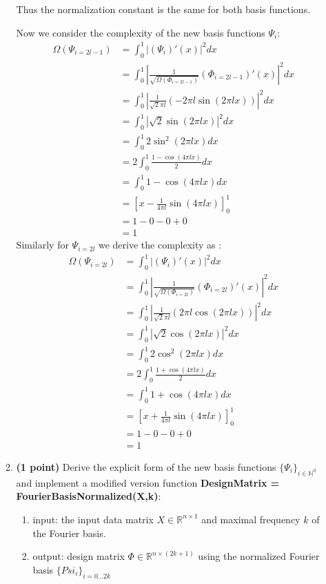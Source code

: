 \documentclass{./tufte-handout}
\begin{document}
\begin{enumerate}[(a)]
\begin{enumerate}
    Thus the normalization constant is the same for both basis functions.

    Now we consider the complexity of the new basis functions $\Psi_i$:
    \begin{align}
            \Omega(\Psi_{i=2l-1}) &= \int_0^1 |(\Psi_i)'(x)|^2 dx \\
             &= \int_0^1 | \frac{1}{\sqrt{\Omega(\Phi_{i=2l-1})}} (\Phi_{i=2l-1})'(x) |^2 dx \\
             &= \int_0^1 | \frac{1}{\sqrt{2} \pi l} (-2 \pi l \sin(2 \pi l x)) |^2 dx \\
             &= \int_0^1 | \sqrt{2} \sin(2 \pi l x) |^2 dx \\
             &= \int_0^1 2 \sin^2(2 \pi l x) dx \\
             &= 2 \int_0^1 \frac{1 - \cos(4 \pi l x)}{2} dx \\
             &= \int_0^1 1 - \cos(4 \pi l x) dx \\
             &= \left[ x - \frac{1}{4 \pi l} \sin(4 \pi l x) \right]_0^1 \\
             &= 1 - 0 - 0 + 0 \\
             &= 1
    \end{align}
    Similarly for $\Psi_{i=2l}$ we derive the complexity as :
    \begin{align}
        \Omega(\Psi_{i=2l}) &= \int_0^1 |(\Psi_i)'(x)|^2 dx \\
             &= \int_0^1 | \frac{1}{\sqrt{\Omega(\Phi_{i=2l})}} (\Phi_{i=2l})'(x) |^2 dx \\
             &= \int_0^1 | \frac{1}{\sqrt{2} \pi l} (2 \pi l \cos(2 \pi l x)) |^2 dx \\
             &= \int_0^1 | \sqrt{2} \cos(2 \pi l x) |^2 dx \\
             &= \int_0^1 2 \cos^2(2 \pi l x) dx \\
             &= 2 \int_0^1 \frac{1 + \cos(4 \pi l x)}{2} dx \\
             &= \int_0^1 1 + \cos(4 \pi l x) dx \\
             &= \left[ x + \frac{1}{4 \pi l} \sin(4 \pi l x) \right]_0^1 \\
             &= 1 - 0 - 0 + 0 \\
             &= 1
    \end{align}
        

    \item \textbf{(1 point)} Derive the explicit form of the new basis functions $\{\Psi_i\}_{i \in \mathbb{N}^0}$ and implement a 
    modified version function \textbf{DesignMatrix = FourierBasisNormalized(X,k)}:
    \begin{enumerate}
        \item input: the input data matrix $X \in \mathbb{R}^{n \times 1}$ and maximal frequency $k$ of the Fourier basis.
        \item output: design matrix  $\Phi \in \mathbb{R}^{n \times (2k+1)}$ using the normalized Fourier basis $\{Psi_i\}_{i = 0 \dots 2k}$
    \end{enumerate}


\end{enumerate}
\end{enumerate}
\end{document}
